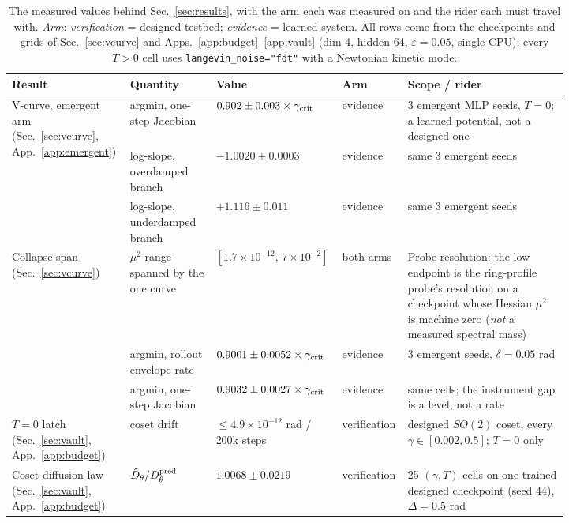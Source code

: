 \documentclass{article}
\begin{document}
\begin{table}[!htb]\centering\footnotesize
\setlength{\tabcolsep}{4pt}
\caption{The measured values behind Sec.~\ref{sec:results}, with the arm each was measured on and the rider each must travel with. \emph{Arm}: \emph{verification} = designed testbed; \emph{evidence} = learned system. All rows come from the checkpoints and grids of Sec.~\ref{sec:vcurve} and Apps.~\ref{app:budget}--\ref{app:vault} (dim 4, hidden 64, $\varepsilon=0.05$, single-CPU); every $T>0$ cell uses \texttt{langevin\_noise="fdt"} with a Newtonian kinetic mode.}
\label{tab:numbers}
\begin{tabular}{p{0.165\linewidth}p{0.15\linewidth}p{0.15\linewidth}p{0.075\linewidth}p{0.28\linewidth}}
\toprule
Result & Quantity & Value & Arm & Scope / rider\\
\midrule
\multirow{3}{\linewidth}{V-curve, emergent arm (Sec.~\ref{sec:vcurve}, App.~\ref{app:emergent})}
 & argmin, one-step Jacobian & $0.902\pm0.003\times\gamma_{\rm crit}$ & evidence & 3 emergent MLP seeds, $T=0$; a learned potential, not a designed one\\
 & log-slope, overdamped branch & $-1.0020\pm0.0003$ & evidence & same 3 emergent seeds\\
 & log-slope, underdamped branch & $+1.116\pm0.011$ & evidence & same 3 emergent seeds\\
\addlinespace
Collapse span (Sec.~\ref{sec:vcurve}) & $\mu^2$ range spanned by the one curve & $[1.7\times10^{-12},\,7\times10^{-2}]$ & both arms & Probe resolution: the low endpoint is the ring-profile probe's resolution on a checkpoint whose Hessian $\mu^2$ is machine zero (\emph{not} a measured spectral mass)\\
\addlinespace
\multirow{2}{\linewidth}{Cross-instrument check (App.~\ref{app:emergent})}
 & argmin, rollout envelope rate & $0.9001\pm0.0052\times\gamma_{\rm crit}$ & evidence & 3 emergent seeds, $\delta=0.05$ rad\\
 & argmin, one-step Jacobian & $0.9032\pm0.0027\times\gamma_{\rm crit}$ & evidence & same cells; the instrument gap is a level, not a rate\\
\addlinespace
$T=0$ latch (Sec.~\ref{sec:vault}, App.~\ref{app:budget}) & coset drift & $\le4.9\times10^{-12}$ rad / 200k steps & verifi\-cation & designed $SO(2)$ coset, every $\gamma\in[0.002,0.5]$; $T=0$ only\\
\addlinespace
Coset diffusion law (Sec.~\ref{sec:vault}, App.~\ref{app:budget}) & $\hat D_\theta/D_\theta^{\rm pred}$ & $1.0068\pm0.0219$ & verifi\-cation & 25 $(\gamma,T)$ cells on one trained designed checkpoint (seed 44), $\Delta=0.5$ rad\\

\end{tabular}
\end{table}
\end{document}
